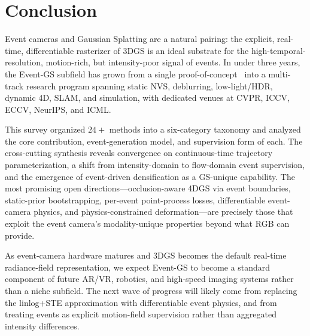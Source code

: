 \section{Conclusion}
\label{sec:conclusion}

Event cameras and Gaussian Splatting are a natural pairing: the explicit, real-time, differentiable rasterizer of 3DGS is an ideal substrate for the high-temporal-resolution, motion-rich, but intensity-poor signal of events. In under three years, the Event-GS subfield has grown from a single proof-of-concept~\cite{han2024event3dgs,deguchi2024e2gs} into a multi-track research program spanning static NVS, deblurring, low-light/HDR, dynamic 4D, SLAM, and simulation, with dedicated venues at CVPR, ICCV, ECCV, NeurIPS, and ICML.

This survey organized $24+$ methods into a six-category taxonomy and analyzed the core contribution, event-generation model, and supervision form of each. The cross-cutting synthesis reveals convergence on continuous-time trajectory parameterization, a shift from intensity-domain to flow-domain event supervision, and the emergence of event-driven densification as a GS-unique capability. The most promising open directions---occlusion-aware 4DGS via event boundaries, static-prior bootstrapping, per-event point-process losses, differentiable event-camera physics, and physics-constrained deformation---are precisely those that exploit the event camera's modality-unique properties beyond what RGB can provide.

As event-camera hardware matures and 3DGS becomes the default real-time radiance-field representation, we expect Event-GS to become a standard component of future AR/VR, robotics, and high-speed imaging systems rather than a niche subfield. The next wave of progress will likely come from replacing the linlog+STE approximation with differentiable event physics, and from treating events as explicit motion-field supervision rather than aggregated intensity differences.
